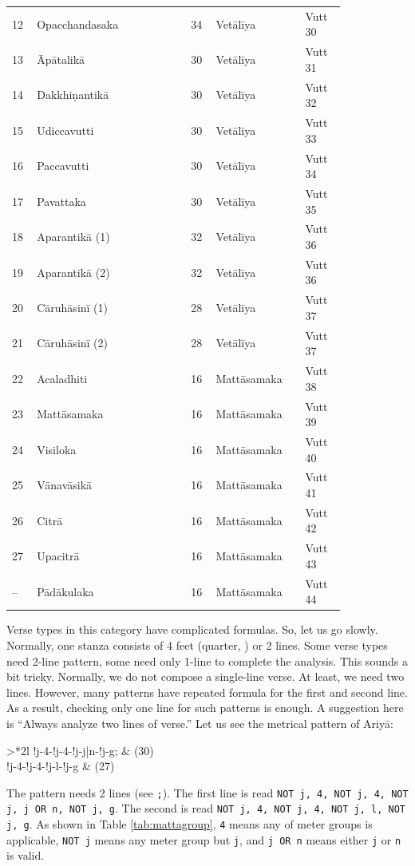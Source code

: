 \begin{longtable}[c]{p{0.05\linewidth}p{0.40\linewidth}p{0.05\linewidth}p{0.23\linewidth}p{0.1\linewidth}}
12 & Opacchandasaka & 34 & Vetālīya & Vutt\,30 \\
13 & Āpātalikā & 30 & Vetālīya & Vutt\,31 \\
14 & Dakkhiṇantikā & 30 & Vetālīya & Vutt\,32 \\
15 & Udiccavutti & 30 & Vetālīya & Vutt\,33 \\
16 & Paccavutti & 30 & Vetālīya & Vutt\,34 \\
17 & Pavattaka & 30 & Vetālīya & Vutt\,35 \\
18 & Aparantikā (1) & 32 & Vetālīya & Vutt\,36 \\
19 & Aparantikā (2) & 32 & Vetālīya & Vutt\,36 \\
20 & Cāruhāsinī (1) & 28 & Vetālīya & Vutt\,37 \\
21 & Cāruhāsinī (2) & 28 & Vetālīya & Vutt\,37 \\
22 & Acaladhiti & 16 & Mattāsamaka & Vutt\,38 \\
23 & Mattāsamaka & 16 & Mattāsamaka & Vutt\,39 \\
24 & Visiloka & 16 & Mattāsamaka & Vutt\,40 \\
25 & Vānavāsikā & 16 & Mattāsamaka & Vutt\,41 \\
26 & Citrā & 16 & Mattāsamaka & Vutt\,42 \\
27 & Upacitrā & 16 & Mattāsamaka & Vutt\,43 \\
-- & Pādākulaka & 16 & Mattāsamaka & Vutt\,44 \\
\end{longtable}

Verse types in this category have complicated formulas. So, let us go slowly. Normally, one stanza consists of 4 feet (quarter, ) or 2 lines. Some verse types need 2-line pattern, some need only 1-line to complete the analysis. This sounds a bit tricky. Normally, we do not compose a single-line verse. At least, we need two lines. However, many patterns have repeated formula for the first and second line. As a result, checking only one line for such patterns is enough. A suggestion here is ``Always analyze two lines of verse.'' Let us see the metrical pattern of Ariyā:

\bigskip
\begin{tabular}{>{\large\ttfamily}*{2}l}
!j-4-!j-4-!j-j|n-!j-g; & (30) \\
!j-4-!j-4-!j-l-!j-g & (27) \\
\end{tabular}
\bigskip

The pattern needs 2 lines (see \texttt{;}). The first line is read \texttt{NOT j, 4, NOT j, 4, NOT j, j OR n, NOT j, g}. The second is read \texttt{NOT j, 4, NOT j, 4, NOT j, l, NOT j, g}. As shown in Table \ref{tab:mattagroup}, \texttt{4} means any of meter groups is applicable, \texttt{NOT j} means any meter group but \texttt{j}, and \texttt{j OR n} means either \texttt{j} or \texttt{n} is valid.


